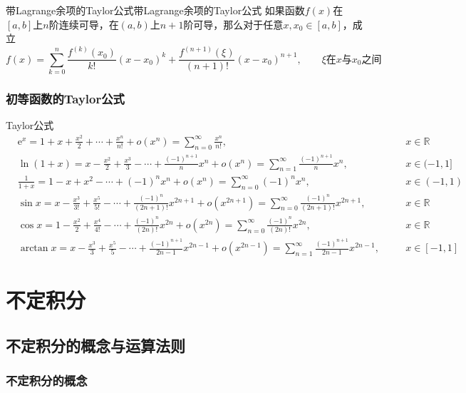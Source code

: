 \documentclass[lang = cn, scheme = chinese, thmcnt = section]{elegantbook}
\begin{document}
\begin{theorem}{带Lagrange余项的Taylor公式}{带Lagrange余项的Taylor公式}
	如果函数$f(x)$在$[a,b]$上$n$阶连续可导，在$(a,b)$上$n+1$阶可导，那么对于任意$x,x_0\in [a,b]$，成立
	$$
	f(x)
	=\sum_{k=0}^{n}\frac{f^{(k)}(x_0)}{k!}(x-x_0)^k+
	\frac{f^{(n+1)}(\xi)}{(n+1)!}(x-x_0)^{n+1},\qquad 
	\xi\text{在}x\text{与}x_0\text{之间}
	$$
\end{theorem}

\subsection{初等函数的Taylor公式}

\begin{theorem}{Taylor公式}
	\begin{align*}
		&\mathrm{e}^{x}
		=1+x+\frac{x^2}{2}+\cdots+\frac{x^n}{n!}+o(x^n)
		=\sum_{n=0}^{\infty}{\frac{x^n}{n!}}
		,\quad && x\in\mathbb{R}\\
		&\ln{(1+x)}
		=x-\frac{x^2}{2}+\frac{x^3}{3}-\cdots+\frac{(-1)^{n+1}}{n}x^n+o(x^n)
		=\sum_{n=1}^{\infty}{\frac{(-1)^{n+1}}{n}x^n}
		,\quad && x\in(-1,1]\\
		&\frac{1}{1+x}
		=1-x+x^2-\cdots+(-1)^n x^n+o(x^n)
		=\sum_{n=0}^{\infty}{(-1)^n x^n}
		,\quad && x\in(-1,1)\\
		&\sin{x}
		=x-\frac{x^3}{3!}+\frac{x^5}{5!}-\cdots+\frac{(-1)^n}{(2n+1)!}x^{2n+1}+o(x^{2n+1})
		=\sum_{n=0}^{\infty}{\frac{(-1)^n}{(2n+1)!}x^{2n+1}}
		,\quad && x\in\mathbb{R}\\
		&\cos{x}
		=1-\frac{x^2}{2}+\frac{x^4}{4!}-\cdots+\frac{(-1)^n}{(2n)!}x^{2n}+o(x^{2n})
		=\sum_{n=0}^{\infty}{\frac{(-1)^n}{(2n)!}x^{2n}}
		,\quad && x\in\mathbb{R}\\
		&\arctan{x}
		=x-\frac{x^3}{3}+\frac{x^5}{5}-\cdots+\frac{(-1)^{n+1}}{2n-1}x^{2n-1}+o(x^{2n-1})
		=\sum_{n=1}^{\infty}{\frac{(-1)^{n+1}}{2n-1}x^{2n-1}}
		,\quad && x\in[-1,1]
	\end{align*}
\end{theorem}

\chapter{不定积分}

\section{不定积分的概念与运算法则}

\subsection{不定积分的概念}
\end{document}
